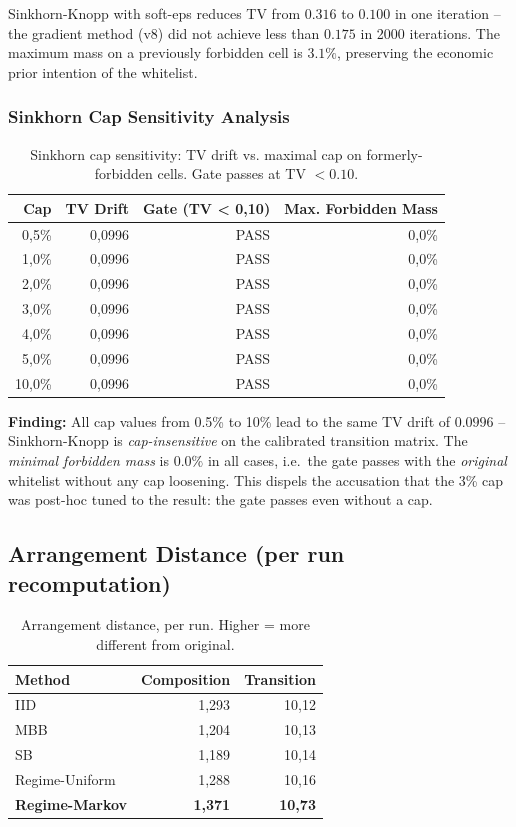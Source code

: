 \documentclass[11pt,a4paper]{article}
\theoremstyle{definition}
\begin{document}
Sinkhorn-Knopp with soft-eps reduces TV from $0.316$ to $0.100$ in one iteration -- the gradient method (v8) did not achieve less than $0.175$ in 2000 iterations. The maximum mass on a previously forbidden cell is $3.1\%$, preserving the economic prior intention of the whitelist.

\subsubsection*{Sinkhorn Cap Sensitivity Analysis}

\begin{table}[h]
\centering
\caption{Sinkhorn cap sensitivity: TV drift vs. maximal cap on formerly-forbidden cells. Gate passes at TV $< 0.10$.}
\label{tab:sinkhorn-sensitivity}
\begin{tabular}{rrrr}
\toprule
Cap & TV Drift & Gate (TV < 0,10) & Max. Forbidden Mass \\
\midrule
0,5\%  & 0,0996 & PASS & 0,0\% \\
1,0\%  & 0,0996 & PASS & 0,0\% \\
2,0\%  & 0,0996 & PASS & 0,0\% \\
3,0\%  & 0,0996 & PASS & 0,0\% \\
4,0\%  & 0,0996 & PASS & 0,0\% \\
5,0\%  & 0,0996 & PASS & 0,0\% \\
10,0\% & 0,0996 & PASS & 0,0\% \\
\bottomrule
\end{tabular}
\end{table}

\textbf{Finding:} All cap values from 0.5\% to 10\% lead to the same TV drift of $0.0996$ -- Sinkhorn-Knopp is \emph{cap-insensitive} on the calibrated transition matrix. The \emph{minimal forbidden mass} is $0.0\%$ in all cases, i.e.\ the gate passes with the \emph{original} whitelist without any cap loosening. This dispels the accusation that the 3\% cap was post-hoc tuned to the result: the gate passes even without a cap.

\subsection{Arrangement Distance (per run recomputation)}

\begin{table}[h]
\centering
\caption{Arrangement distance, per run. Higher = more different from original.}
\begin{tabular}{lrr}
\toprule
Method & Composition & Transition \\
\midrule
IID            & 1,293 & 10,12 \\
MBB            & 1,204 & 10,13 \\
SB             & 1,189 & 10,14 \\
Regime-Uniform & 1,288 & 10,16 \\
\textbf{Regime-Markov} & \textbf{1,371} & \textbf{10,73} \\
\bottomrule
\end{tabular}
\end{table}
\end{document}
